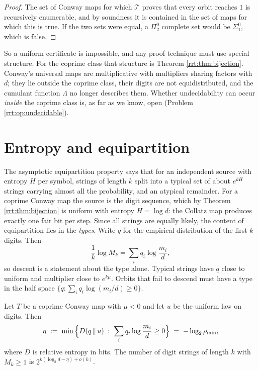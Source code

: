 \begin{proof}
The set of Conway maps for which $\mathcal{T}$ proves that every orbit reaches $1$ is recursively enumerable, and by soundness it is contained in the set of maps for which this is true. If the two sets were equal, a $\Pi^0_2$ complete set \cite{kurtz2007} would be $\Sigma^0_1$, which is false.
\end{proof}

So a uniform certificate is impossible, and any proof technique must use special structure. For the coprime class that structure is Theorem \ref{rrt:thm:bijection}. Conway's universal maps are multiplicative with multipliers sharing factors with $d$; they lie outside the coprime class, their digits are not equidistributed, and the cumulant function $\Lambda$ no longer describes them. Whether undecidability can occur \emph{inside} the coprime class is, as far as we know, open (Problem \ref{rrt:op:undecidable}).

\section{Entropy and equipartition}\label{rrt:sec:entropy}

The asymptotic equipartition property \cite{cover2006} says that for an independent source with entropy $H$ per symbol, strings of length $k$ split into a typical set of about $e^{kH}$ strings carrying almost all the probability, and an atypical remainder. For a coprime Conway map the source is the digit sequence, which by Theorem \ref{rrt:thm:bijection} is uniform with entropy $H=\log d$: the Collatz map produces exactly one fair bit per step. Since all strings are equally likely, the content of equipartition lies in the \emph{types}. Write $q$ for the empirical distribution of the first $k$ digits. Then
\[
\frac1k\log M_k=\sum_i q_i\log\frac{m_i}{d},
\]
so descent is a statement about the type alone. Typical strings have $q$ close to uniform and multiplier close to $e^{k\mu}$. Orbits that fail to descend must have a type in the half space $\{q:\sum_i q_i\log(m_i/d)\ge 0\}$.

\begin{theorem}\label{rrt:thm:duality}
Let $T$ be a coprime Conway map with $\mu<0$ and let $u$ be the uniform law on digits. Then
\[
\eta\;:=\;\min\Big\{D(q\,\|\,u)\;:\;\sum_i q_i\log\frac{m_i}{d}\ge 0\Big\}\;=\;-\log_2\rho_{\min} ,
\]
where $D$ is relative entropy in bits. The number of digit strings of length $k$ with $M_k\ge 1$ is $2^{k(\log_2 d-\eta)+o(k)}$.
\end{theorem}

